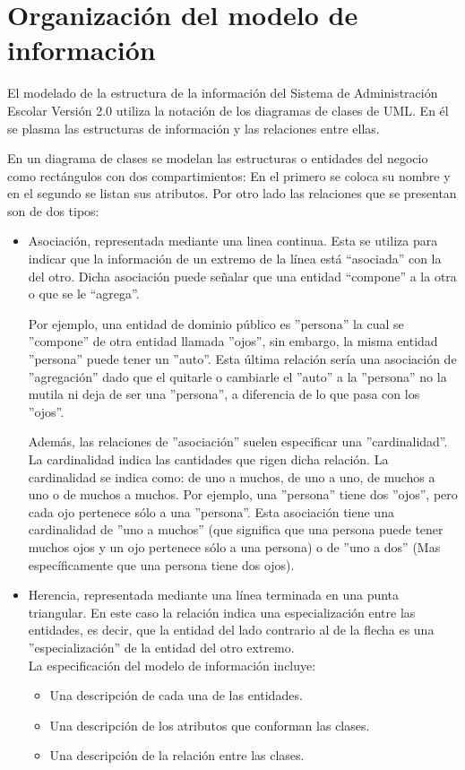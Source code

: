 \newpage
\section{Organización del modelo de información}

El modelado de la estructura de la información del Sistema de Administración Escolar Versión 2.0 utiliza la notación de los diagramas de clases de UML. En él se plasma las estructuras de información y las relaciones entre ellas.

En un diagrama de clases se modelan las estructuras o entidades del negocio como rectángulos con dos compartimientos: En el primero se coloca su nombre y en el segundo se listan sus atributos. Por otro lado las relaciones que se presentan son de dos tipos:

\begin{itemize}
	\item Asociación, representada mediante una linea continua. Esta se utiliza para indicar que la información de un extremo de la línea está “asociada” con la del otro. Dicha asociación puede señalar que una entidad “compone” a la otra o que se le “agrega”.
	
	Por ejemplo, una entidad de dominio público es ''persona'' la cual se ''compone'' de otra entidad llamada ''ojos'', sin embargo, la misma entidad ''persona'' puede tener un ''auto''. Esta última relación sería una asociación de ''agregación'' dado que el quitarle o cambiarle el ''auto'' a la ''persona'' no la mutila ni deja de ser una ''persona'', a diferencia de lo que pasa con los ''ojos''.
	
	Además, las relaciones de ''asociación'' suelen especificar una ''cardinalidad''. La cardinalidad indica las cantidades que rigen dicha relación. La cardinalidad se indica como: de uno a muchos, de uno a uno, de muchos a uno o de muchos a muchos. Por ejemplo, una ''persona'' tiene dos ''ojos'', pero cada ojo pertenece sólo a una ''persona''. Esta asociación tiene una cardinalidad de ''uno a muchos'' (que significa que una persona puede tener muchos ojos y un ojo pertenece sólo a una persona) o de ''uno a dos'' (Mas específicamente que una persona tiene dos ojos).
	
	\item Herencia, representada mediante una línea terminada en una punta triangular. En este caso la relación indica una especialización entre las entidades, es decir, que la entidad del lado contrario al de la flecha es una ''especialización'' de la entidad del otro extremo. \\
	
	La especificación del modelo de información incluye:
	\begin{itemize}
		\item Una descripción de cada una de las entidades.
		\item Una descripción de los atributos que conforman las clases.
		\item Una descripción de la relación entre las clases.
	\end{itemize}
\end{itemize}
